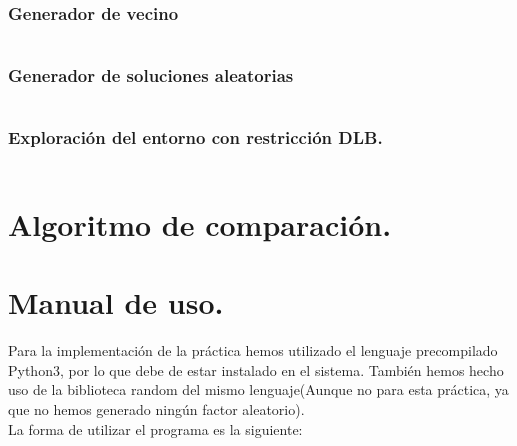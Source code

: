 \begin{lstlisting}

\end{lstlisting}

\subsubsection{Generador de vecino}
\begin{lstlisting}

\end{lstlisting}
\subsubsection{Generador de soluciones aleatorias}
\begin{lstlisting}

\end{lstlisting}
\subsubsection{Exploración del entorno con restricción DLB.}

\begin{lstlisting}

\end{lstlisting}

\newpage

\section{Algoritmo de comparación.}



\newpage

\section{Manual de uso.}

Para la implementación de la práctica hemos utilizado el lenguaje precompilado Python3, por lo que debe de estar instalado en el sistema. También hemos hecho uso de la biblioteca random del mismo lenguaje(Aunque no para esta práctica, ya que no hemos generado ningún factor aleatorio).\\

La forma de utilizar el programa es la siguiente:\\

